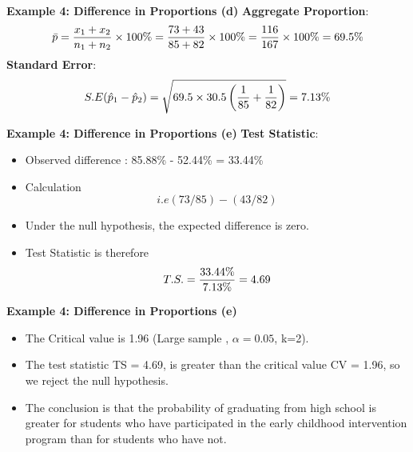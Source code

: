 




\noindent \textbf{Example 4: Difference in Proportions (d)}
\textbf{Aggregate Proportion}:\\
\[ \bar{p}  = {x_1  + x_2 \over n_1 + n_2} \times 100\% = {73+43 \over 85 + 82} \times 100\% = { 116 \over 167}\times 100\% = 69.5\% \]
\textbf{Standard Error}:\\
\[ S.E (\hat{p}_1 - \hat{p}_2)  =  \sqrt{69.5 \times 30.5  \left( {1 \over 85} + {1 \over 82}  \right)}  = 7.13\% \]






\noindent \textbf{Example 4: Difference in Proportions (e)}
\textbf{Test Statistic}:
\begin{itemize} \item Observed difference :
85.88\% - 52.44\%  = 33.44\% \item Calculation \[ i.e (73/85) - (43 /82) \]
\item Under the null hypothesis, the expected difference is zero.
\item Test Statistic is therefore \[T.S. = {33.44\% \over 7.13\%} = 4.69\]
\end{itemize}



\noindent \textbf{Example 4: Difference in Proportions (e)}
\begin{itemize}
\item The Critical value is 1.96 (Large sample , $\alpha = 0.05$, k=2).

\item The test statistic TS = 4.69, is greater than the critical value CV = 1.96, so we reject the null hypothesis.
\item The conclusion is that the probability of graduating from high school is greater for students who have participated in the early childhood intervention program than for students who have not.
\end{itemize}
